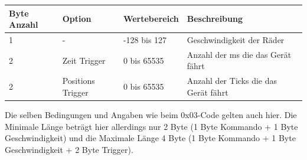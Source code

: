 \documentclass[a4paper]{article}
\begin{document}
	\begin{tabularx}{\linewidth}{|l|l|l|X|}
		\hline
		\textbf{Byte Anzahl} & \textbf{Option} & \textbf{Wertebereich} & \textbf{Beschreibung} \\
		\hline
		\hline
		1					 & - & -128 bis 127 & Geschwindigkeit der Räder \\
		\hline
		2					 & Zeit Trigger & 0 bis 65535 &  Anzahl der ms die das Gerät fährt\\
		\hline
		2					 & Positions Trigger & 0 bis 65535 &  Anzahl der Ticks die das Gerät fährt\\
		\hline
	\end{tabularx}

	Die selben Bedingungen und Angaben wie beim 0x03-Code gelten auch hier. Die Minimale Länge beträgt hier
	allerdings nur 2 Byte (1 Byte Kommando + 1 Byte Geschwindigkeit) und die Maximale Länge 4 Byte (1 Byte
	Kommando + 1 Byte Geschwindigkeit + 2 Byte Trigger).
	
\end{document}

